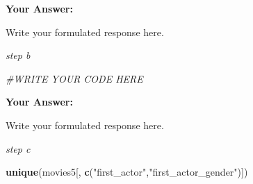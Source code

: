 \documentclass[
]{article}
\newenvironment{Shaded}{\begin{snugshade}}{\end{snugshade}}
\newcommand{\CommentTok}[1]{\textcolor[rgb]{0.56,0.35,0.01}{\textit{#1}}}
\newcommand{\FunctionTok}[1]{\textcolor[rgb]{0.13,0.29,0.53}{\textbf{#1}}}
\newcommand{\NormalTok}[1]{#1}
\newcommand{\StringTok}[1]{\textcolor[rgb]{0.31,0.60,0.02}{#1}}
\begin{document}
\textbf{Your Answer:}

Write your formulated response here.

\emph{step b}

\begin{Shaded}
\begin{Highlighting}[]
\CommentTok{\#WRITE YOUR CODE HERE}
\end{Highlighting}
\end{Shaded}

\textbf{Your Answer:}

Write your formulated response here.

\emph{step c}

\begin{Shaded}
\begin{Highlighting}[]
\FunctionTok{unique}\NormalTok{(movies5[, }\FunctionTok{c}\NormalTok{(}\StringTok{"first\_actor"}\NormalTok{,}\StringTok{"first\_actor\_gender"}\NormalTok{)])}
\end{Highlighting}
\end{Shaded}
\end{document}
